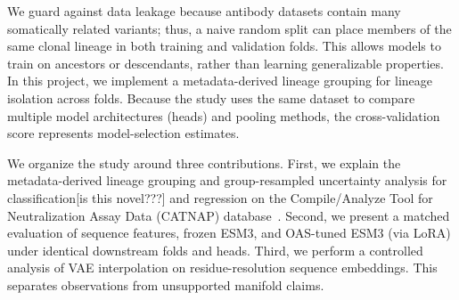We guard against data leakage because antibody datasets
contain many somatically related variants; thus, a naive
random split can place members of the same clonal lineage in both training and
validation folds. This allows models to train on ancestors or descendants,
rather than learning generalizable properties. In
this project, we implement a metadata-derived lineage grouping for
lineage isolation across folds. Because the
study uses the same dataset to compare multiple model architectures (heads) and pooling
methods, the cross-validation score represents model-selection
estimates.

We organize the study around three contributions. First, we explain the
metadata-derived lineage grouping and group-resampled uncertainty
analysis for classification[is this novel???] and regression on the Compile/Analyze Tool for
Neutralization Assay Data (CATNAP) database~\cite{yoon2015catnap}. Second, we
present a matched evaluation of sequence features, frozen ESM3, and OAS-tuned
ESM3 (via LoRA) under identical downstream folds and heads. Third, we perform
a controlled analysis of VAE interpolation on residue-resolution sequence embeddings.
This separates observations from unsupported manifold claims.
